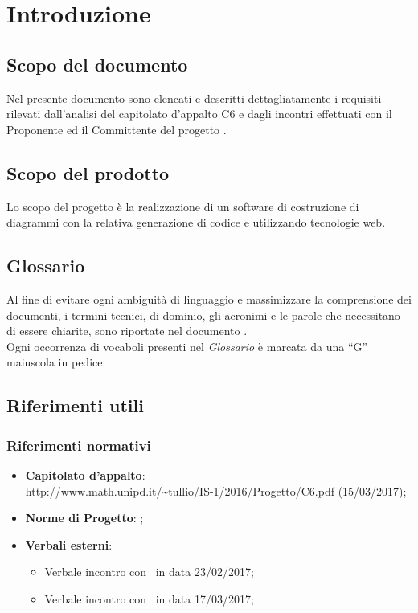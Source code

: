\documentclass[../AnalisiDeiRequisiti.tex]{subfiles}
\begin{document}
	\section{Introduzione}
		\subsection{Scopo del documento}
			Nel presente documento sono elencati e descritti dettagliatamente i requisiti
			rilevati dall'analisi del capitolato d'appalto C6 e dagli incontri effettuati
			con il Proponente ed il Committente del progetto \progetto.
		\subsection{Scopo del prodotto}
			Lo scopo del progetto è la realizzazione di un software di
			costruzione di diagrammi  con la relativa generazione
			di codice  e  utilizzando tecnologie
			web.
		\subsection{Glossario}
			Al fine di evitare ogni ambiguità di linguaggio e massimizzare la
			comprensione dei documenti, i termini tecnici, di dominio, gli
			acronimi e le parole che necessitano di essere chiarite, sono
			riportate nel documento \glossariov.\\
			Ogni occorrenza di vocaboli presenti nel \textit{Glossario} è
			marcata da una ``G'' maiuscola in pedice.
		\subsection{Riferimenti utili}
			\subsubsection{Riferimenti normativi}
    			\begin{itemize}
    				\item \textbf{Capitolato d'appalto}:\\
					\url{http://www.math.unipd.it/~tullio/IS-1/2016/Progetto/C6.pdf} (15/03/2017);
					\item \textbf{Norme di Progetto}: \normediprogettov;
    				\item \textbf{Verbali esterni}:
    					\begin{itemize}
    						\item Verbale incontro con \proponente\ in data 23/02/2017;
    						\item Verbale incontro con \proponente\ in data 17/03/2017;
    					\end{itemize}
				\end{itemize}
\end{document}
